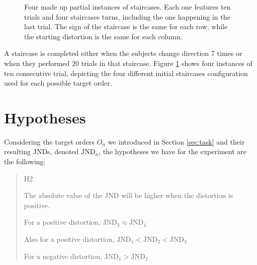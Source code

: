 \begin{figure}[h]
    \caption{Four made up partial instances of staircases. Each one features ten trials and four staircases turns, including the one happening in the last trial. The sign of the staircase is the same for each row, while the starting distortion is the same for each column.}\label{fig:trials}
\end{figure}

A staircase is completed either when the subjects change direction 7 times or when they performed 20 trials in that staircase. Figure \ref{fig:trials} shows four instances of ten consecutive trial, depicting the four different initial staircases configuration used for each possible target order.

\section{Hypotheses}

Considering the target orders $O_n$  we introduced in Section \ref{sec:task} and their resulting JNDs, denoted $\text{JND}_n$, the hypotheses we have for the experiment are the following:

\begin{quote}
    \begin{labeling}[:]{H2}
      \item [H1] The absolute value of the JND will be higher when the distortion is positive.
      \item [H2] For a positive distortion, $\text{JND}_3 \approx \text{JND}_4$
      \item [H3] Also for a positive distortion, $\text{JND}_1 < \text{JND}_2 < \text{JND}_3$
      \item [H4] For a negative distortion, $\text{JND}_1 > \text{JND}_2$
    \end{labeling}
\end{quote}

